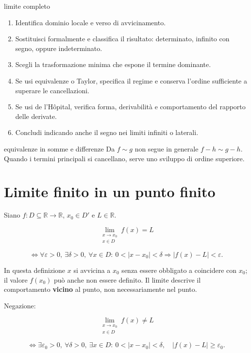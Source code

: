 \begin{proceduraesame}{limite completo}
\begin{enumerate}
\item Identifica dominio locale e verso di avvicinamento.
\item Sostituisci formalmente e classifica il risultato: determinato, infinito con segno, oppure indeterminato.
\item Scegli la trasformazione minima che espone il termine dominante.
\item Se usi equivalenze o Taylor, specifica il regime e conserva l'ordine sufficiente a superare le cancellazioni.
\item Se usi de l'Hôpital, verifica forma, derivabilità e comportamento del rapporto delle derivate.
\item Concludi indicando anche il segno nei limiti infiniti o laterali.
\end{enumerate}
\end{proceduraesame}
\begin{errorefrequente}{equivalenze in somme e differenze}
Da $f\sim g$ non segue in generale $f-h\sim g-h$. Quando i termini principali si cancellano, serve uno sviluppo di ordine superiore.
\end{errorefrequente}

\section{Limite finito in un punto finito}\label{limite-finito-in-un-punto-finito}

Siano \(f:D\subseteq\mathbb R\to\mathbb R\), \(x_0\in D'\) e \(L\in\mathbb R\).

\[
\lim_{\substack{x\to x_0\\x\in D}}f(x)=L
\]

\[
\Longleftrightarrow
\forall\varepsilon>0,\ \exists\delta>0,\ \forall x\in D:\
0<|x-x_0|<\delta
\Rightarrow
|f(x)-L|<\varepsilon.
\]

In questa definizione \(x\) si avvicina a \(x_0\) senza essere obbligato a coincidere con \(x_0\); il valore \(f(x_0)\) può anche non essere definito. Il limite descrive il comportamento \textbf{vicino} al punto, non necessariamente nel punto.

Negazione:

\[
\lim_{\substack{x\to x_0\\x\in D}}f(x)\ne L
\]

\[
\Longleftrightarrow
\exists\varepsilon_0>0,\ \forall\delta>0,\ \exists x\in D:\
0<|x-x_0|<\delta,
\quad
|f(x)-L|\ge\varepsilon_0.
\]

